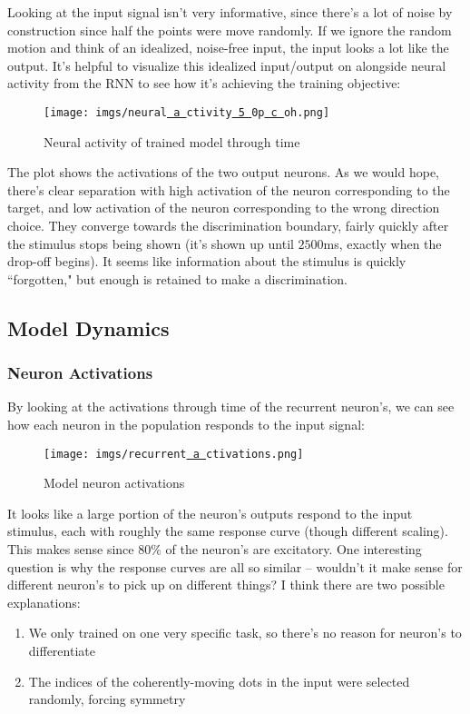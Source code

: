 \documentclass[11pt]{article}
\renewcommand{\_}[1]{\underline{ #1 }}
\theoremstyle{definition}
\begin{document}
Looking at the input signal isn't very informative, since there's a lot of noise by construction since half the points were move randomly. If we ignore the random motion and think of an idealized, noise-free input, the input looks a lot like the output. It's helpful to visualize this idealized input/output on alongside neural activity from the RNN to see how it's achieving the training objective:

\begin{figure}[H]
  \centering
  \texttt{[image: imgs/neural\_activity\_50p\_coh.png]}
  \caption{Neural activity of trained model through time}
  \label{neural_activity}
\end{figure}

The plot shows the activations of the two output neurons. As we would hope, there's clear separation with high activation of the neuron corresponding to the target, and low activation of the neuron corresponding to the wrong direction choice. They converge towards the discrimination boundary, fairly quickly after the stimulus stops being shown (it's shown up until $2500$ms, exactly when the drop-off begins). It seems like information about the stimulus is quickly ``forgotten," but enough is retained to make a discrimination.

\subsection{Model Dynamics}

\subsubsection{Neuron Activations}

By looking at the activations through time of the recurrent neuron's, we can see how each neuron in the population responds to the input signal:

\begin{figure}[H]
  \centering
  \texttt{[image: imgs/recurrent\_activations.png]}
  \caption{Model neuron activations}
\end{figure}

It looks like a large portion of the neuron's outputs respond to the input stimulus, each with roughly the same response curve (though different scaling). This makes sense since $80\%$ of the neuron's are excitatory. One interesting question is why the response curves are all so similar -- wouldn't it make sense for different neuron's to pick up on different things? I think there are two possible explanations:
\begin{enumerate}
  \item We only trained on one very specific task, so there's no reason for neuron's to differentiate
  \item The indices of the coherently-moving dots in the input were selected randomly, forcing symmetry
\end{enumerate}
\end{document}
